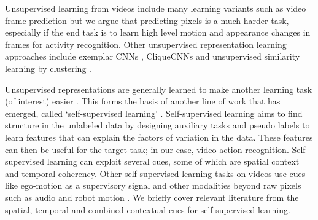 \documentclass[10pt,twocolumn,letterpaper]{article}
\begin{document}
Unsupervised learning from videos include many learning variants such as video frame prediction \cite{wiskott2002slow,mobahi2009deep,srivastava2015unsupervised,taylor2010convolutional,goroshin2015unsupervised} but we argue that predicting pixels is a much harder task, especially if the end task is to learn high level motion and appearance changes in frames for activity recognition. Other unsupervised representation learning approaches include exemplar CNNs \cite{dosovitskiy2016discriminative}, CliqueCNNs \cite{bautista2016cliquecnn} and unsupervised similarity learning by clustering \cite{bautista2017deep}. 

Unsupervised representations are generally learned to make another learning task (of interest) easier \cite{goodfellow2016deep}. This forms the basis of another line of work that has emerged, called `self-supervised learning' \cite{doersch2015unsupervised,misra2016shuffle,zhang2016colorful,larsson2016learning,wang2015unsupervised,doersch2017multi,wang2017transitive,noroozi2017representation}. Self-supervised learning aims to find structure in the unlabeled data by designing auxiliary tasks and pseudo labels to learn features that can explain the factors of variation in the data. These features can then be useful for the target task; in our case, video action recognition. Self-supervised learning can exploit several cues, some of which are spatial context and temporal coherency. Other self-supervised learning tasks on videos use cues like ego-motion \cite{zhou2015temporal,jayaraman2015learning,agrawal2015learning} as a supervisory signal and other modalities beyond raw pixels such as audio \cite{owens2016ambient,owens2016visually} and robot motion \cite{agrawal2016learning,pinto2017supervision,pinto2016curious,pinto2017learning}. We briefly cover relevant literature from the spatial, temporal and combined contextual cues for self-supervised learning.
\vspace{-2mm}
\end{document}
